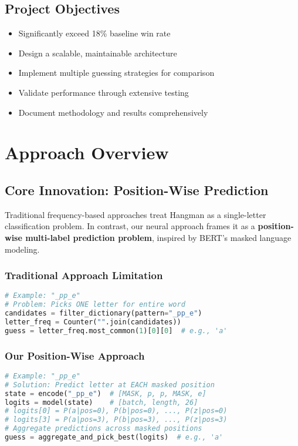 \documentclass[12pt,a4paper]{article}
\begin{document}
\subsection{Project Objectives}
\begin{itemize}
    \item Significantly exceed 18\% baseline win rate
    \item Design a scalable, maintainable architecture
    \item Implement multiple guessing strategies for comparison
    \item Validate performance through extensive testing
    \item Document methodology and results comprehensively
\end{itemize}

\section{Approach Overview}

\subsection{Core Innovation: Position-Wise Prediction}

Traditional frequency-based approaches treat Hangman as a single-letter classification problem. In contrast, our neural approach frames it as a \textbf{position-wise multi-label prediction problem}, inspired by BERT's masked language modeling.

\subsubsection{Traditional Approach Limitation}
\begin{lstlisting}[language=Python, caption={Traditional Frequency-Based Approach}]
# Example: "_pp_e"
# Problem: Picks ONE letter for entire word
candidates = filter_dictionary(pattern="_pp_e")
letter_freq = Counter("".join(candidates))
guess = letter_freq.most_common(1)[0][0]  # e.g., 'a'
\end{lstlisting}

\subsubsection{Our Position-Wise Approach}
\begin{lstlisting}[language=Python, caption={Position-Wise Neural Approach}]
# Example: "_pp_e"
# Solution: Predict letter at EACH masked position
state = encode("_pp_e")  # [MASK, p, p, MASK, e]
logits = model(state)    # [batch, length, 26]
# logits[0] = P(a|pos=0), P(b|pos=0), ..., P(z|pos=0)
# logits[3] = P(a|pos=3), P(b|pos=3), ..., P(z|pos=3)
# Aggregate predictions across masked positions
guess = aggregate_and_pick_best(logits)  # e.g., 'a'
\end{lstlisting}
\end{document}
